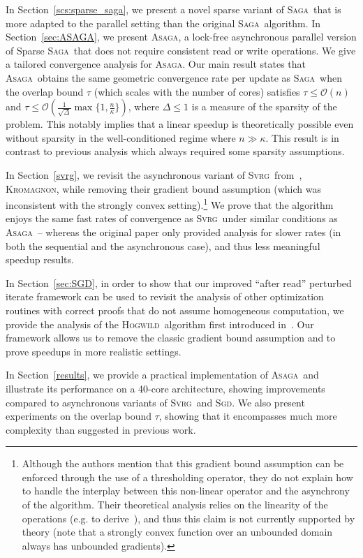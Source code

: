 \documentclass[twoside, 11pt]{article}
\newcommand{\overlap}{\tau}
\newcommand{\sparsity}{\Delta}
\newcommand{\ASAGA}{\textsc{Asaga}}
\newcommand{\SAGA}{\textsc{Saga}}
\newcommand{\SVRG}{\textsc{Svrg}}
\newcommand{\Hogwild}{\textsc{Hogwild}}
\newcommand{\SGD}{\textsc{Sgd}}
\newcommand{\KROMAGNON}{\textsc{Kromagnon}}
\begin{document}
In Section~\ref{scs:sparse_saga}, we present a novel sparse variant of \SAGA\ that is more adapted to the parallel setting than the original \SAGA\ algorithm.
In Section~\ref{sec:ASAGA}, we present \ASAGA, a lock-free asynchronous parallel version of Sparse \SAGA\ that does not require consistent read or write operations.
We give a tailored convergence analysis for \ASAGA. Our main result states that \ASAGA\ obtains the same geometric convergence rate per update as \SAGA\ when the overlap bound $\overlap$ (which scales with the number of cores) satisfies
$\overlap \leq \mathcal{O}(n)$ and $\overlap \leq \mathcal{O}({\scriptstyle \frac{1}{\sqrt{\sparsity}}} \max\{1,\frac{n}{\kappa} \})$, where $\sparsity \leq 1$ is a measure of the sparsity of the problem.
This notably implies that a linear speedup is theoretically possible even without sparsity in the well-conditioned regime where $n \gg \kappa$.
This result is in contrast to previous analysis which always required some sparsity assumptions.

In Section~\ref{svrg}, we revisit the asynchronous variant of \SVRG\ from~\citet{mania}, \KROMAGNON, while removing their gradient bound assumption (which was inconsistent with the strongly convex setting).\footnote{Although the authors mention that this gradient bound assumption can be enforced through the use of a thresholding operator, they do not explain how to handle the interplay between this non-linear operator and the asynchrony of the algorithm. Their theoretical analysis relies on the linearity of the operations (e.g. to derive~\citep[Eq. (2.6)]{mania}), and thus this claim is not currently supported by theory (note that a strongly convex function over an unbounded domain always has unbounded gradients).}
We prove that the algorithm enjoys the same fast rates of convergence as \SVRG\ under similar conditions as \ASAGA\ -- whereas the original paper only provided analysis for slower rates (in both the sequential and the asynchronous case), and thus less meaningful speedup results.

In Section~\ref{sec:SGD}, in order to show that our improved ``after read'' perturbed iterate framework can be used to revisit the analysis of other optimization routines with correct proofs that do not assume homogeneous computation, we provide the analysis of the \Hogwild\ algorithm first introduced in~\citet{hogwild}.
Our framework allows us to remove the classic gradient bound assumption and to prove speedups in more realistic settings.

In Section~\ref{results}, we provide a practical implementation of \ASAGA\ and illustrate its performance on a 40-core architecture, showing improvements compared to asynchronous variants of \SVRG\ and \SGD.
We also present experiments on the overlap bound $\overlap$, showing that it encompasses much more complexity than suggested in previous work.
\end{document}
